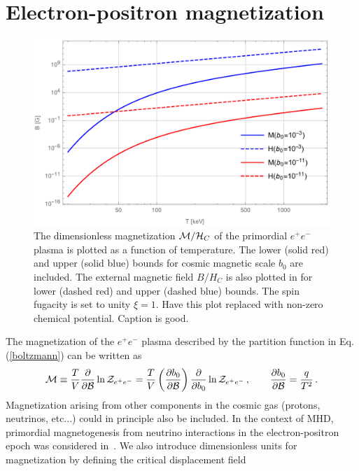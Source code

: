 \documentclass[a4paper]{article}
\newcommand{\req}[1]{Eq.\,(\ref{#1})}
\newcommand*{\xred}{\color{red}}
\begin{document}
\section{Electron-positron magnetization}
\label{sec:magnetization}
\begin{figure}[ht]
    \centering
    \includegraphics[width=\textwidth]{magplot.pdf}
    \caption{The dimensionless magnetization ${\cal M}/{\cal H}_{C}$ of the primordial $e^{+}e^{-}$ plasma is plotted as a function of temperature. The lower (solid red) and upper (solid blue) bounds for cosmic magnetic scale $b_{0}$ are included. The external magnetic field $B/H_{C}$ is also plotted in for lower (dashed red) and upper (dashed blue) bounds. The spin fugacity is set to unity $\xi=1$. {\xred Have this plot replaced with non-zero chemical potential. Caption is good.}}
    \label{magnetization} 
\end{figure}
\noindent The magnetization of the $e^{+}e^{-}$ plasma described by the partition function in \req{boltzmann} can be written as
\begin{align}
    \label{defmagetization}
    {\cal M}\equiv\frac{T}{V}\frac{\partial}{\partial{\cal B}}\ln{{\cal Z}_{e^{+}e^{-}}} = \frac{T}{V}\left(\frac{\partial b_{0}}{\partial{\cal B}}\right)\frac{\partial}{\partial b_{0}}\ln{{\cal Z}_{e^{+}e^{-}}}\,,\qquad\frac{\partial b_{0}}{\partial{\cal B}}=\frac{q}{T^{2}}\,.
\end{align}
Magnetization arising from other components in the cosmic gas (protons, neutrinos, etc...) could in principle also be included. In the context of MHD, primordial magnetogenesis from neutrino interactions in the electron-positron epoch was considered in~\cite{perrone2021neutrinoelectron}. We also introduce dimensionless units for magnetization by defining the critical displacement field
\end{document}

